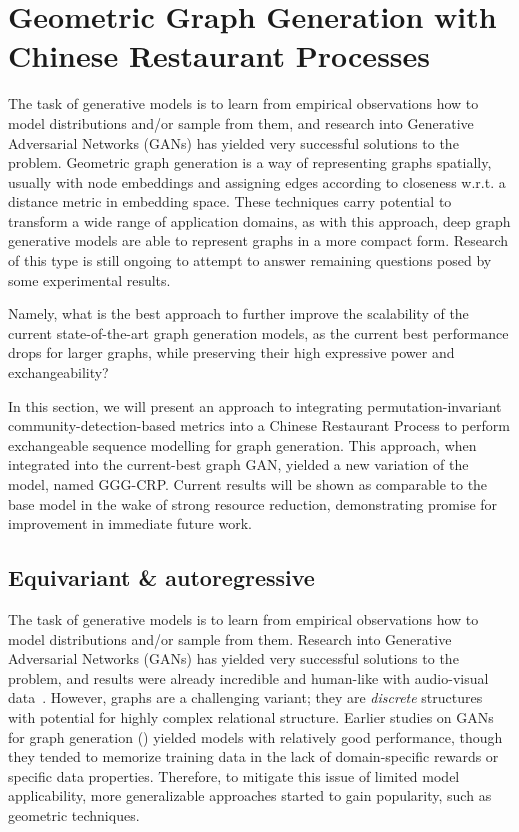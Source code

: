 \section{Geometric Graph Generation with Chinese Restaurant Processes}
\label{sec: gggcrp}

The task of generative models is to learn from empirical observations how to model distributions and/or sample from them, and research into Generative Adversarial Networks (GANs) has yielded very successful solutions to the problem. Geometric graph generation is a way of representing graphs spatially, usually with node embeddings and assigning edges according to closeness w.r.t. a distance metric in embedding space. These techniques carry potential to transform a wide range of application domains, as with this approach, deep graph generative models are able to represent graphs in a more compact form. Research of this type is still ongoing to attempt to answer remaining questions posed by some experimental results. 

Namely, what is the best approach to further improve the scalability of the current state-of-the-art graph generation models, as the current best performance drops for larger graphs, while preserving their high expressive power and exchangeability?

In this section, we will present an approach to integrating permutation-invariant community-detection-based metrics into a Chinese Restaurant Process to perform exchangeable sequence modelling for graph generation. This approach, when integrated into the current-best graph GAN, yielded a new variation of the model, named GGG-CRP. Current results will be shown as comparable to the base model in the wake of strong resource reduction, demonstrating promise for improvement in immediate future work.

\subsection{Equivariant \& autoregressive}

The task of generative models is to learn from empirical observations how to
model distributions and/or sample from them. Research into Generative Adversarial Networks (GANs) has yielded very successful solutions to the problem, and results were already incredible and human-like with audio-visual data~\cite{karras_analyzing_2020}. However, graphs are a challenging variant; they are \emph{discrete} structures with potential for highly complex relational structure. 
Earlier studies on GANs for graph generation (\cite{bojchevski_netgan_2018, de_cao_molgan_2018}) yielded models with relatively good performance, though they tended to memorize training data in the lack of domain-specific rewards or specific data properties. Therefore, to mitigate this issue of limited model applicability, more generalizable approaches started to gain popularity, such as geometric techniques.

